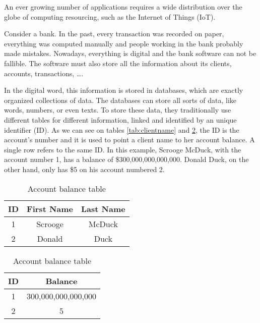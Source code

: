 An ever growing number of applications requires a wide distribution over the globe of computing resourcing, such as the Internet of Things (IoT).







Consider a bank. In the past, every transaction was recorded on paper, everything was computed manually and people working in the bank probably made mistakes. Nowadays, everything is digital and the bank software can not be fallible. The software must also store all the information about its clients, accounts, transactions, \dots.

In the digital word, this information is stored in databases, which are exactly organized collections of data. The databases can store all sorts of data, like words, numbers, or even texts. To store these data, they traditionally use different tables for different information, linked and identified by an unique identifier (ID). As we can see on tables \ref{tab:clientname} and \ref{tab:accountbalance}, the ID is the account's number and it is used to point a client name to her account balance. A single row refers to the same ID. In this example, Scrooge McDuck, with the account number 1, has a balance of \$300,000,000,000,000. Donald Duck, on the other hand, only has \$5 on his account numbered 2.
\begin{table}[H]
  \begin{minipage}[b]{0.45\linewidth}\centering
\begin{tabular}{|c|c|c|}
\hline
ID & First Name & Last Name \\
\hline
1 & Scrooge & McDuck \\
2 & Donald & Duck \\
\hline
\end{tabular}
\caption{Client name table}
\label{tab:clientname}
  \end{minipage}
\begin{minipage}[b]{0.45\linewidth}\centering

\begin{tabular}{|c|c|}
\hline
ID & Balance \\
\hline
1 & 300,000,000,000,000 \\
2 & 5 \\
\hline
\end{tabular}
\caption{Account balance table}
\label{tab:accountbalance}
\end{minipage}
\end{table}


